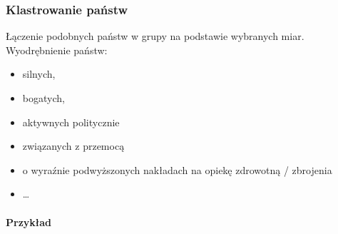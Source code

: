 \documentclass[11pt]{report}
\begin{document}
    \subsubsection{Klastrowanie państw}
    Łączenie podobnych państw w grupy na podstawie wybranych miar.
    Wyodrębnienie państw:
    \begin{itemize}
        \item silnych,
        \item bogatych,
        \item aktywnych politycznie
        \item związanych z przemocą
        \item o wyraźnie podwyższonych nakładach na opiekę zdrowotną / zbrojenia
        \item \ldots
    \end{itemize}

    \paragraph{Przykład}
\end{document}
